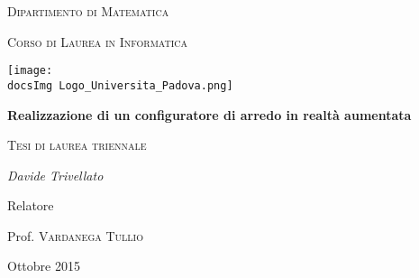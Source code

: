 \begin{titlepage}
	\centering
	{\scshape\LARGE Dipartimento di Matematica \par}
	\vspace{1cm}
	{\scshape\Large Corso di Laurea in Informatica\par}
	\vspace{1.5cm}
	
	\texttt{[image: \\docsImg Logo\_Universita\_Padova.png]}
	\vspace{1cm}
	
	{\huge\bfseries Realizzazione di un configuratore di arredo in realtà aumentata \par}
	\vspace{0.5cm}
	{\scshape\Large Tesi di laurea triennale\par}
	\vspace{1.5cm}
	
	{\Large\itshape Davide Trivellato\par}
	\vfill
	Relatore\par
	Prof. \textsc{Vardanega Tullio}
	
	\vfill
	
	{\large Ottobre 2015\par}
\end{titlepage}